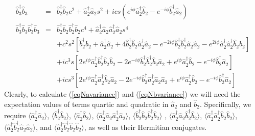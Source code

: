 \documentclass{iopart}
\begin{document}
\begin{eqnarray}
\hat{b}^{\dagger}_3 \hat{b}_3 &=& \hat{b}^{\dagger}_2 \hat{b}_2 c^2 +  \hat{a}^{\dagger}_2 \hat{a}_2 s^2 + i c s ( e^{i \phi} \hat{a}^{\dagger}_2 \hat{b}_2 - e^{-i \phi} \hat{b}^{\dagger}_2 \hat{a}_2) \\
%
%
\hat{b}^{\dagger}_3 \hat{b}_3 \hat{b}^{\dagger}_3 \hat{b}_3 &=& \hat{b}^{\dagger}_2 \hat{b}_2 \hat{b}^{\dagger}_2 \hat{b}_2 c^4 + \hat{a}^{\dagger}_2 \hat{a}_2 \hat{a}^{\dagger}_2 \hat{a}_2 s^4 \nonumber \\
%
&& + c^2 s^2 [ \hat{b}^{\dagger}_2 \hat{b}_2 + \hat{a}^{\dagger}_2 \hat{a}_2 + 4 \hat{b}^{\dagger}_2 \hat{b}_2 \hat{a}^{\dagger}_2 \hat{a}_2 - e^{-2 i \phi} \hat{b}^{\dagger}_2 \hat{b}^{\dagger}_2 \hat{a}_2 \hat{a}_2 -e^{2 i \phi} \hat{a}^{\dagger}_2 \hat{a}^{\dagger}_2 \hat{b}_2 \hat{b}_2 ] \nonumber \\
%
&& + i c^3 s [2 e^{i \phi} \hat{a}^{\dagger}_2 \hat{b}^{\dagger}_2 \hat{b}_2 \hat{b}_2 - 2 e^{-i \phi} \hat{b}^{\dagger}_2 \hat{b}^{\dagger}_2 \hat{b}_2 \hat{a}_2 + e^{i \phi} \hat{a}^{\dagger}_2 \hat{b}_2 - e^{-i \phi} \hat{b}^{\dagger}_2 \hat{a}_2 ] \nonumber \\
%
&& + i c s^3 [2 e^{i \phi} \hat{a}^{\dagger}_2 \hat{a}^{\dagger}_2 \hat{b}_2 \hat{a}_2 - 2 e^{-i \phi} \hat{b}^{\dagger}_2 \hat{a}^{\dagger}_2 \hat{a}_2 \hat{a}_2 + e^{i \phi} \hat{a}^{\dagger}_2 \hat{b}_2 - e^{-i \phi} \hat{b}^{\dagger}_2 \hat{a}_2 ] 
\end{eqnarray}
Clearly, to calculate (\ref{eqNavariance}) and (\ref{eqNbvariance}) we will need the expectation values of terms quartic and quadratic in $\hat{a}_2$ and ${\hat{b}_2}$. Specifically, we require $\langle \hat{a}^{\dagger}_2 \hat{a}_2 \rangle$, $\langle \hat{b}^{\dagger}_2 \hat{b}_2 \rangle$,  $\langle \hat{a}^{\dagger}_2 \hat{b}_2 \rangle$, $\langle \hat{a}^{\dagger}_2 \hat{a}_2 \hat{a}^{\dagger}_2 \hat{a}_2 \rangle$, $\langle \hat{b}^{\dagger}_2 \hat{b}_2 \hat{b}^{\dagger}_2 \hat{b}_2 \rangle$ , $\langle \hat{a}^{\dagger}_2 \hat{a}_2 \hat{b}^{\dagger}_2 \hat{b}_2 \rangle$, $\langle \hat{a}^{\dagger}_2 \hat{a}^{\dagger}_2 \hat{b}_2 \hat{b}_2 \rangle$, $\langle \hat{a}^{\dagger}_2 \hat{b}^{\dagger}_2 \hat{a}_2 \hat{a}_2 \rangle$, and $\langle \hat{a}^{\dagger}_2 \hat{b}^{\dagger}_2 \hat{b}_2 \hat{b}_2 \rangle$, as well as their Hermitian conjugates.
\end{document}

